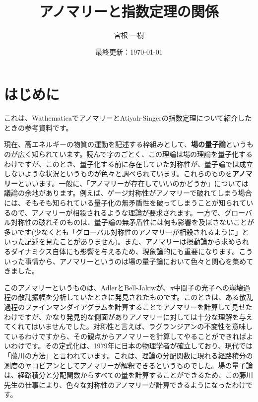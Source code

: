 \documentclass[unicode,a4paper,10pt]{ltjsarticle}
\begin{document}
\title{
  アノマリーと指数定理の関係
}
\author{
  宮根 一樹
}
\date{最終更新：\today}

\maketitle
\tableofcontents

\section{はじめに}

これは、WathematicaでアノマリーとAtiyah-Singerの指数定理について紹介したときの参考資料です。

現在、高エネルギーの物質の運動を記述する枠組みとして、\textbf{場の量子論}というものが広く知られています。読んで字のごとく、この理論は場の理論を量子化するわけですが、このとき、量子化する前に存在していた対称性が、量子論では成立しないような状況というものが色々と調べられています。これらのものを\textbf{アノマリー}といいます。一般に、「アノマリーが存在していいのかどうか」については議論の余地があります。例えば、ゲージ対称性がアノマリーで破れてしまう場合には、そもそも知られている量子化の無矛盾性を破ってしまうことが知られているので、アノマリーが相殺されるような理論が要求されます。一方で、グローバル対称性の破れそのものは、量子論の無矛盾性には何も影響を及ぼさないことが多いです(少なくとも「グローバル対称性のアノマリーが相殺されるように」といった記述を見たことがありません)。また、アノマリーは摂動論から求められるダイナミクス自体にも影響を与えるため、現象論的にも重要になります。こういった事情から、アノマリーというのは場の量子論において色々と関心を集めてきました。

このアノマリーというものは、Adler\cite{Adler:1969gk}とBell-Jakiw\cite{Bell:1969ts}が、$\pi$中間子の光子への崩壊過程の散乱振幅を分析していたときに発見されたものです。このときは、ある散乱過程のファインマンダイアグラムを計算することでアノマリーを計算して見せたわけですが、かなり発見的な側面がありアノマリーに対しては十分な理解を与えてくれてはいませんでした。対称性と言えば、ラグランジアンの不変性を意味しているわけですから、その観点からアノマリーを計算してやることができればよいわけです。その定式化は、1979年に日本の物理学者が確立しており、現代では「藤川の方法」と言われています\cite{Fujikawa:1979ay}。これは、理論の分配関数に現れる経路積分の測度のヤコビアンとしてアノマリーが解釈できるというものでした。場の量子論は、経路積分と分配関数からすべての量を計算することができるため、この藤川先生の仕事により、色々な対称性のアノマリーが計算できるようになったわけです。
\end{document}
